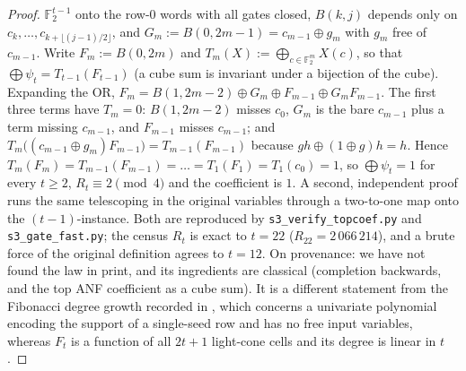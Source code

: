 \documentclass[11pt]{article}
\theoremstyle{definition}
\theoremstyle{remark}
\newcommand{\F}{\mathbb{F}_2}
\begin{document}
\begin{proof}
$\F^{t-1}$ onto the row-$0$ words with all gates closed, $B(k,j)$ depends only on $c_k,\dots,c_{k+\lfloor(j-1)/2\rfloor}$,
and $G_m:=B(0,2m-1)=c_{m-1}\oplus g_m$ with $g_m$ free of $c_{m-1}$. Write $F_m:=B(0,2m)$ and $T_m(X):=\bigoplus_{c\in\F^m}X(c)$,
so that $\bigoplus\psi_t=T_{t-1}(F_{t-1})$ (a cube sum is invariant under a bijection of the cube). Expanding the OR,
$F_m=B(1,2m-2)\oplus G_m\oplus F_{m-1}\oplus G_mF_{m-1}$. The first three terms have $T_m=0$: $B(1,2m-2)$ misses $c_0$,
$G_m$ is the bare $c_{m-1}$ plus a term missing $c_{m-1}$, and $F_{m-1}$ misses $c_{m-1}$; and
$T_m\bigl((c_{m-1}\oplus g_m)F_{m-1}\bigr)=T_{m-1}(F_{m-1})$ because $gh\oplus(1\oplus g)h=h$. Hence
$T_m(F_m)=T_{m-1}(F_{m-1})=\dots=T_1(F_1)=T_1(c_0)=1$, so $\bigoplus\psi_t=1$ for every $t\ge2$, $R_t\equiv2\pmod4$ and the coefficient is $1$. A second,
independent proof runs the same telescoping in the original variables through a two-to-one map onto
the $(t-1)$-instance. Both are reproduced by \texttt{s3\_verify\_topcoef.py} and
\texttt{s3\_gate\_fast.py}; the census $R_t$ is exact to $t=22$ ($R_{22}=2\,066\,214$), and a brute
force of the original definition agrees to $t=12$. On provenance: we have not found the law in print, and its ingredients are classical (completion backwards, and the top ANF coefficient as a cube sum). It is a different statement from the Fibonacci degree growth recorded in \cite{CLMR}, which concerns a univariate polynomial encoding the support of a single-seed row and has no free input variables, whereas $F_t$ is a function of all $2t+1$ light-cone cells and its degree is linear in $t$.
\end{proof}
\end{document}
